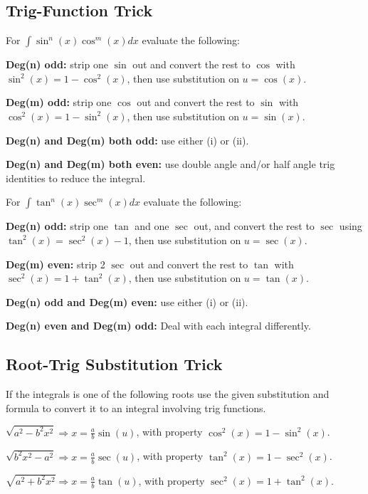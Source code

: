 \documentclass[8pt,a4paper]{extarticle}     %
\theoremstyle{definition}
\theoremstyle{definition}
\theoremstyle{definition}
\begin{document}
\begin{multicols}{4}
\subsection{Trig-Function Trick}
For $\int \sin^n(x)\cos^m(x)dx$ evaluate the following: 
\begin{eqlist}
	\item \textbf{Deg(n) odd: } strip one $\sin$ out and convert the rest to $\cos$ with $\sin^2(x) = 1-\cos^2(x)$, then use substitution on $u=\cos(x)$.
	\item \textbf{Deg(m) odd: } strip one $\cos$ out and convert the rest to $\sin$ with $\cos^2(x) = 1-\sin^2(x)$, then use substitution on $u=\sin(x)$.
	\item \textbf{Deg(n) and Deg(m) both odd:} use either (i) or (ii).
	\item \textbf{Deg(n) and Deg(m) both even:} use double angle and/or half angle trig identities to reduce the integral. 
\end{eqlist}
For $\int \tan^n(x)\sec^m(x)dx$ evaluate the following:
\begin{eqlist}
	\item \textbf{Deg(n) odd: } strip one $\tan$ and one $\sec$ out, and convert the rest to $\sec$ using $\tan^2(x) = \sec^2(x)-1$, then use substitution on $u=\sec(x)$.
	\item \textbf{Deg(m) even: } strip 2 $\sec$ out and convert the rest to $\tan$ with $\sec^2(x) = 1+\tan^2(x)$, then use substitution on $u=\tan(x)$.
	\item \textbf{Deg(n) odd and Deg(m) even:} use either (i) or (ii).
	\item \textbf{Deg(n) even and Deg(m) odd:} Deal with each integral differently. 
\end{eqlist}
\subsection{Root-Trig Substitution Trick}
If the integrals is one of the following roots use the given substitution and formula to convert it to an integral involving trig functions. 
\begin{eqlist}
	\item $\sqrt{a^2-b^2x^2} \Longrightarrow x = \frac{a}{b}\sin(u)$, with property $\cos^2(x)=1-\sin^2(x)$.
	\item $\sqrt{b^2x^2-a^2} \Longrightarrow x = \frac{a}{b}\sec(u)$, with property $\tan^2(x)=1-\sec^2(x)$.
	\item $\sqrt{a^2+b^2x^2} \Longrightarrow x = \frac{a}{b}\tan(u)$, with property $\sec^2(x)=1+\tan^2(x)$.
\end{eqlist}

\end{multicols}
\end{document}
